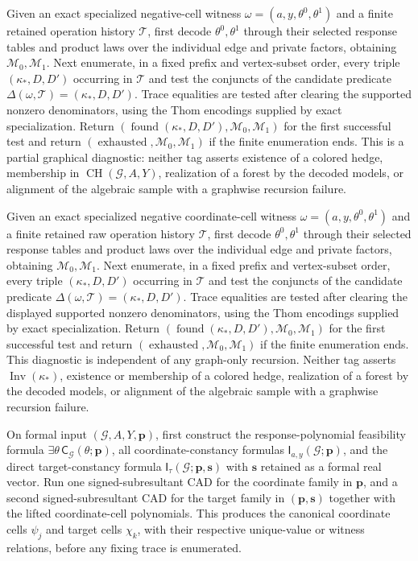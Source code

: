 Given an exact specialized negative-cell witness \(\omega=(a,y,\theta^0,\theta^1)\) and a finite retained operation history \(\mathcal T\), first decode \(\theta^0,\theta^1\) through their selected response tables and product laws over the individual edge and private factors, obtaining \(\mathcal M_0,\mathcal M_1\). Next enumerate, in a fixed prefix and vertex-subset order, every triple \((\kappa_*,D,D')\) occurring in \(\mathcal T\) and test the conjuncts of the candidate predicate \(\Delta(\omega,\mathcal T)=(\kappa_*,D,D')\). Trace equalities are tested after clearing the supported nonzero denominators, using the Thom encodings supplied by exact specialization. Return \((\operatorname{found}(\kappa_*,D,D'),\mathcal M_0,\mathcal M_1)\) for the first successful test and return \((\operatorname{exhausted},\mathcal M_0,\mathcal M_1)\) if the finite enumeration ends. This is a partial graphical diagnostic: neither tag asserts existence of a colored hedge, membership in \(\operatorname{CH}(\mathcal G,A,Y)\), realization of a forest by the decoded models, or alignment of the algebraic sample with a graphwise recursion failure.

Given an exact specialized negative coordinate-cell witness \(\omega=(a,y,\theta^0,\theta^1)\) and a finite retained raw operation history \(\mathcal T\), first decode \(\theta^0,\theta^1\) through their selected response tables and product laws over the individual edge and private factors, obtaining \(\mathcal M_0,\mathcal M_1\). Next enumerate, in a fixed prefix and vertex-subset order, every triple \((\kappa_*,D,D')\) occurring in \(\mathcal T\) and test the conjuncts of the candidate predicate \(\Delta(\omega,\mathcal T)=(\kappa_*,D,D')\). Trace equalities are tested after clearing the displayed supported nonzero denominators, using the Thom encodings supplied by exact specialization. Return \((\operatorname{found}(\kappa_*,D,D'),\mathcal M_0,\mathcal M_1)\) for the first successful test and return \((\operatorname{exhausted},\mathcal M_0,\mathcal M_1)\) if the finite enumeration ends. This diagnostic is independent of any graph-only recursion. Neither tag asserts \(\operatorname{Inv}(\kappa_*)\), existence or membership of a colored hedge, realization of a forest by the decoded models, or alignment of the algebraic sample with a graphwise recursion failure.

On formal input \((\mathcal G,A,Y,\mathbf p)\), first construct the response-polynomial feasibility formula \(\exists\theta\,\mathsf C_{\mathcal G}(\theta;\mathbf p)\), all coordinate-constancy formulas \(\mathsf I_{a,y}(\mathcal G;\mathbf p)\), and the direct target-constancy formula \(\mathsf I_{\tau}(\mathcal G;\mathbf p,\mathbf s)\) with \(\mathbf s\) retained as a formal real vector. Run one signed-subresultant CAD for the coordinate family in \(\mathbf p\), and a second signed-subresultant CAD for the target family in \((\mathbf p,\mathbf s)\) together with the lifted coordinate-cell polynomials. This produces the canonical coordinate cells \(\psi_j\) and target cells \(\chi_k\), with their respective unique-value or witness relations, before any fixing trace is enumerated.

